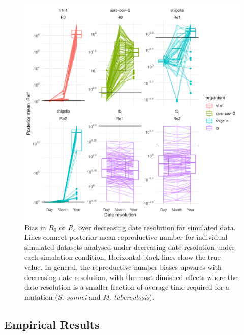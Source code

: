 \documentclass{article}
\begin{document}
\begin{spacing}{1.5}
\begin{figure}
    \centering
    \includegraphics{sim_Re_trajectory.pdf}
    \caption{Bias in $R_0$ or $R_e$ over decreasing date resolution for simulated data. Lines connect posterior mean reproductive number for individual simulated datasets analysed under decreasing date resolution under each simulation condition. Horizontal black lines show the true value. In general, the reproductive number biases upwares with decreasing date resolution, with the most dimished effects where the date resolution is a smaller fraction of average time required for a mutation (\textit{S. sonnei} and \textit{M. tuberculosis}).}
    \label{fig:simR0}
\end{figure}

\subsection*{Empirical Results}


\end{spacing}
\end{document}
